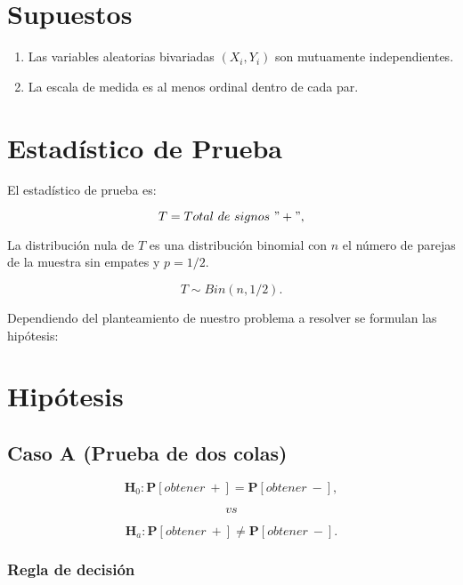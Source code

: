 \documentclass[
  a4paper,
  oneside,
  openany]{book}
\begin{document}
\hypertarget{supuestos-2}{%
\section{Supuestos}\label{supuestos-2}}

\begin{enumerate}
\def\labelenumi{\arabic{enumi})}
\item
  Las variables aleatorias bivariadas \((X_{i},Y_{i})\) son mutuamente independientes.
\item
  La escala de medida es al menos ordinal dentro de cada par.
\end{enumerate}

\hypertarget{estaduxedstico-de-prueba-2}{%
\section{Estadístico de Prueba}\label{estaduxedstico-de-prueba-2}}

El estadístico de prueba es:

\[T=Total\ de\ signos\ "+",\]

La distribución nula de \(T\) es una distribución binomial con \(n\) el número de parejas de la muestra sin empates y \(p=1/2\).

\[T\sim Bin(n,1/2).\]

Dependiendo del planteamiento de nuestro problema a resolver se formulan las hipótesis:

\hypertarget{hipuxf3tesis-2}{%
\section{Hipótesis}\label{hipuxf3tesis-2}}

\hypertarget{caso-a-prueba-de-dos-colas-2}{%
\subsection*{Caso A (Prueba de dos colas)}\label{caso-a-prueba-de-dos-colas-2}}


\[\textbf{H}_0: \mathbf{P}[obtener\ +]= \mathbf{P}[obtener\ -],\]

\[vs\]

\[\textbf{H}_a: \mathbf{P}[obtener\ +] \neq \mathbf{P}[obtener\ -].\]

\hypertarget{regla-de-decisiuxf3n-6}{%
\subsubsection*{Regla de decisión}\label{regla-de-decisiuxf3n-6}}
\end{document}
